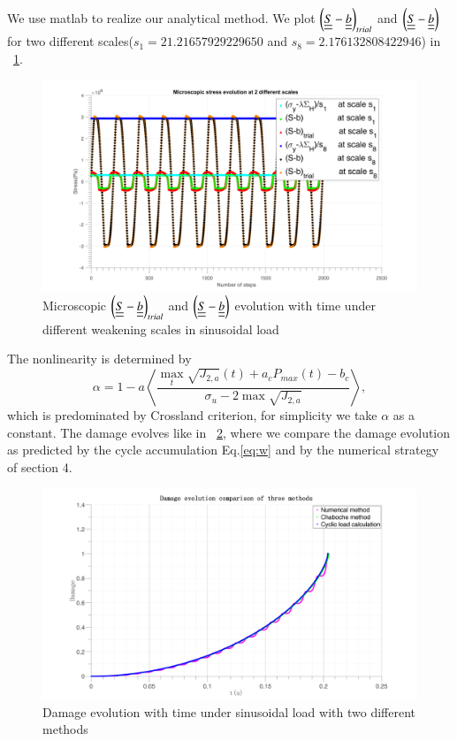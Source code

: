 \documentclass[3p,times,number,review]{elsarticle}
\newcommand{\figref}[1]{\figurename~\ref{#1}}
\begin{document}
We use matlab to realize our analytical method. We plot $\left( \uline{\uline{S}}-\uline{\uline{b}}\right)_{trial}$ and $\left( \uline{\uline{S}}-\uline{\uline{b}}\right)$ for two different scales($s_1=21.21657929229650$ and $s_8=2.176132808422946$) in \figref{trialsin}.
\begin{figure}[!h]
	\centering
	\includegraphics[width=\textwidth]{figures//trialsin.png} 
	\caption{Microscopic $\left( \uline{\uline{S}}-\uline{\uline{b}}\right)_{trial}$ and $\left( \uline{\uline{S}}-\uline{\uline{b}}\right)$ evolution with time under different weakening scales in sinusoidal load}
	\label{trialsin}
\end{figure}

The nonlinearity is determined by 
$$\alpha=1 - a\left\langle \dfrac{\max\limits_{t}\sqrt{J_{2,a}}(t)+a_c{P_{max}(t)}-b_c}{ \sigma_{u} - 2\max\sqrt{J_{2,a}}}\right\rangle,$$ 
 which is predominated by Crossland criterion, for simplicity we take $\alpha$ as a constant. The damage evolves like in \figref{damsin}, where we compare the damage evolution as predicted by the cycle accumulation Eq.\eqref{eq:w} and by the numerical strategy of section 4.

\begin{figure}[!h]
	\centering
	\includegraphics[width=\textwidth]{figures//damagesin.png} 
	\caption{Damage evolution with time under sinusoidal load with two different methods}
	\label{damsin}
\end{figure}
\end{document}
